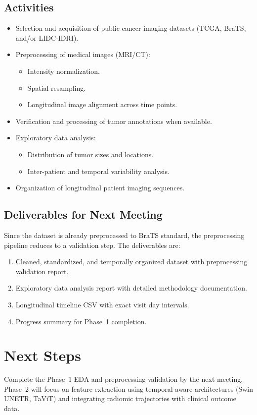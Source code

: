 \documentclass[10pt,a4paper]{article}
\begin{document}
\subsection*{Activities}
\begin{itemize}[nosep, leftmargin=1.5em]
    \item Selection and acquisition of public cancer imaging datasets (TCGA, BraTS, and/or LIDC-IDRI).
    \item Preprocessing of medical images (MRI/CT):
    \begin{itemize}[nosep, leftmargin=1em]
        \item Intensity normalization.
        \item Spatial resampling.
        \item Longitudinal image alignment across time points.
    \end{itemize}
    \item Verification and processing of tumor annotations when available.
    \item Exploratory data analysis:
    \begin{itemize}[nosep, leftmargin=1em]
        \item Distribution of tumor sizes and locations.
        \item Inter-patient and temporal variability analysis.
    \end{itemize}
    \item Organization of longitudinal patient imaging sequences.
\end{itemize}

\subsection*{Deliverables for Next Meeting}
Since the dataset is already preprocessed to BraTS standard, the preprocessing pipeline reduces to a validation step. The deliverables are:
\begin{enumerate}[nosep, leftmargin=1.5em]
    \item Cleaned, standardized, and temporally organized dataset with preprocessing validation report.
    \item Exploratory data analysis report with detailed methodology documentation.
    \item Longitudinal timeline CSV with exact visit day intervals.
    \item Progress summary for Phase~1 completion.
\end{enumerate}

\section{Next Steps}
Complete the Phase~1 EDA and preprocessing validation by the next meeting. Phase~2 will focus on feature extraction using temporal-aware architectures (Swin UNETR, TaViT) and integrating radiomic trajectories with clinical outcome data.
\end{document}
